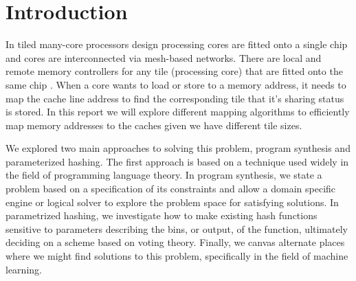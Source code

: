 \section{Introduction}
\label{sec:Introduction}

In tiled many-core processors design processing cores are fitted onto a single
chip and cores are interconnected via mesh-based networks. There are local and
remote memory controllers for any tile (processing core) that are fitted onto
the same chip \cite{tiled-manycore}. When a core wants to load or store to a
memory address, it needs to map the cache line address to find the corresponding
tile that it's sharing status is stored. In this report we will explore
different mapping algorithms to efficiently map memory addresses to the caches
given we have different tile sizes.

We explored two main approaches to solving this problem, program synthesis and
parameterized hashing.  The first approach is based on a technique used widely
in the field of programming language theory.  In program synthesis, we state a
problem based on a specification of its constraints and allow a domain specific
engine or logical solver to explore the problem space for satisfying solutions.
In parametrized hashing, we investigate how to make existing hash functions
sensitive to parameters describing the bins, or output, of the function,
ultimately deciding on a scheme based on voting theory. Finally, we canvas
alternate places where we might find solutions to this problem, specifically in
the field of machine learning.
